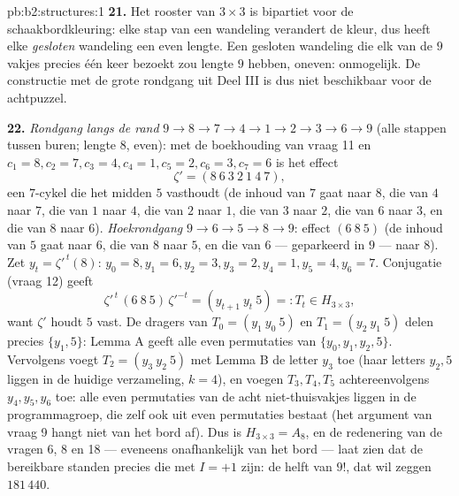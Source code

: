 \begin{solution}{pb:b2:structures:1}
\textbf{21.} Het rooster van $3 \times 3$ is bipartiet voor de
schaakbordkleuring: elke stap van een wandeling verandert de
kleur, dus heeft elke \emph{gesloten} wandeling een even lengte.
Een gesloten wandeling die elk van de $9$ vakjes precies één keer
bezoekt zou lengte $9$ hebben, oneven: onmogelijk. De constructie
met de grote rondgang uit Deel III is dus niet beschikbaar voor de
achtpuzzel.

\textbf{22.} \emph{Rondgang langs de rand} $9 \to 8 \to 7 \to 4
\to 1 \to 2 \to 3 \to 6 \to 9$ (alle stappen tussen buren; lengte
$8$, even): met de boekhouding van vraag 11 en $c_1 = 8, c_2 = 7,
c_3 = 4, c_4 = 1, c_5 = 2, c_6 = 3, c_7 = 6$ is het effect
\[
\zeta' = (8\ 6\ 3\ 2\ 1\ 4\ 7),
\]
een $7$-cykel die het midden $5$ vasthoudt (de inhoud van $7$ gaat
naar $8$, die van $4$ naar $7$, die van $1$ naar $4$, die van $2$
naar $1$, die van $3$ naar $2$, die van $6$ naar $3$, en die van
$8$ naar $6$). \emph{Hoekrondgang} $9 \to 6 \to 5 \to 8 \to 9$:
effect $(6\ 8\ 5)$ (de inhoud van $5$ gaat naar $6$, die van $8$
naar $5$, en die van $6$ --- geparkeerd in $9$ --- naar $8$). Zet
$y_t = \zeta'^{\,t}(8)$: $y_0 = 8, y_1 = 6, y_2 = 3, y_3 = 2, y_4
= 1, y_5 = 4, y_6 = 7$. Conjugatie (vraag 12) geeft
\[
\zeta'^{\,t}\,(6\ 8\ 5)\,\zeta'^{-t}
= (y_{t+1}\ y_t\ 5) =: T_t \in H_{3\times3},
\]
want $\zeta'$ houdt $5$ vast. De dragers van $T_0 = (y_1\ y_0\ 5)$
en $T_1 = (y_2\ y_1\ 5)$ delen precies $\{y_1, 5\}$: Lemma A geeft
alle even permutaties van $\{y_0, y_1, y_2, 5\}$. Vervolgens voegt
$T_2 = (y_3\ y_2\ 5)$ met Lemma B de letter $y_3$ toe (haar
letters $y_2, 5$ liggen in de huidige verzameling, $k = 4$), en
voegen $T_3, T_4, T_5$ achtereenvolgens $y_4, y_5, y_6$ toe: alle
even permutaties van de acht niet-thuisvakjes liggen in de
programmagroep, die zelf ook uit even permutaties bestaat (het
argument van vraag 9 hangt niet van het bord af). Dus is
$H_{3\times3} = A_8$, en de redenering van de vragen 6, 8 en 18
--- eveneens onafhankelijk van het bord --- laat zien dat de
bereikbare standen precies die met $I = +1$ zijn: de helft van
$9!$, dat wil zeggen $181\,440$.


\end{solution}
